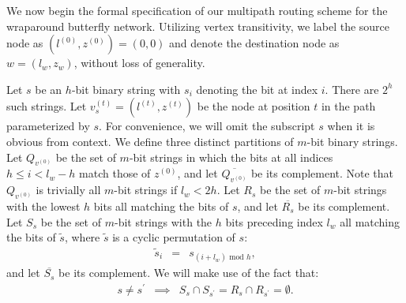\documentclass{sig-alternate-05-2015}
\newcommand{\beq}{\begin{eqnarray}}
\newcommand{\eeq}{\end{eqnarray}}
\begin{document}
We now begin the formal specification of our multipath routing scheme for the
wraparound butterfly network.
Utilizing vertex transitivity, we label the source node as
$(l^{(0)}, z^{(0)}) = (0, 0)$ and denote the destination node as $w = (l_w, z_w)$,
without loss of generality.

Let $s$ be an $h$-bit binary string with $s_i$ denoting the bit at index $i$.
There are $2^h$ such strings.
Let $v_s^{(t)} = (l^{(t)}, z^{(t)})$ be the node at position $t$
in the path parameterized by $s$.
For convenience,
we will omit the subscript $s$ when it is obvious from context.
We define three distinct partitions of $m$-bit binary strings.
Let $Q_{v^{(0)}}$ be the set of $m$-bit
strings in which the bits at
all indices $h \leq i < l_w - h$ match those of $z^{(0)}$,
and let $\overline{Q_{v^{(0)}}}$ be its complement.
Note that $Q_{v^{(0)}}$ is trivially all $m$-bit strings if $l_w < 2h$.
Let $R_s$ be the set of $m$-bit strings with the lowest $h$
bits all matching the bits of $s$,
and let $\overline{R_s}$ be its complement.
Let $S_s$ be the set of $m$-bit strings with the $h$ bits
preceding index $l_w$ all matching the bits of $\tilde{s}$,
where $\tilde{s}$ is a cyclic permutation of $s$:
\beq
\tilde{s}_i &=& s_{(i + l_w) \text{ mod } h},
\eeq
and let $\overline{S_s}$ be its complement.
We will make use of the fact that:
\beq
s \neq s^\prime &\implies&
S_s \cap S_{s^\prime} = R_s \cap R_{s^\prime} = \emptyset.
\eeq
\end{document}
